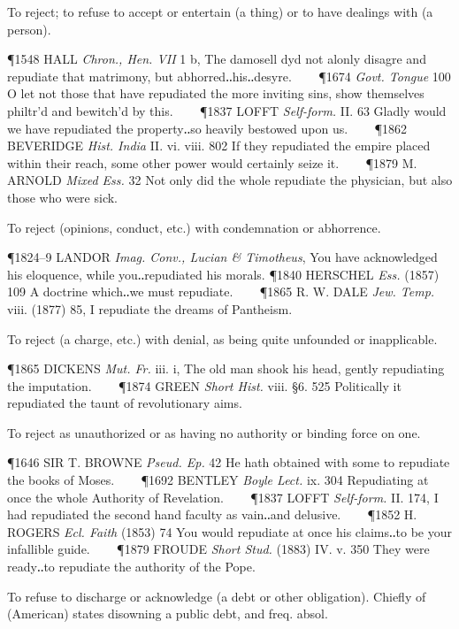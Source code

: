 \begin{description}[wide, labelwidth=!, labelindent=0pt]
\begin{myenumerate}
 To reject; to refuse to accept or entertain (a thing) or to have dealings with (a person).

\P 1548 HALL  \textit{Chron., Hen. VII} 1 b, The damosell dyd not alonly disagre and repudiate that matrimony, but abhorred‥his‥desyre.    
\P 1674  \textit{Govt. Tongue} 100 O let not those that have repudiated the more inviting sins, show themselves philtr'd and bewitch'd by this.    
\P 1837 LOFFT  \textit{Self-form.} II. 63 Gladly would we have repudiated the property‥so heavily bestowed upon us.    
\P 1862 BEVERIDGE  \textit{Hist. India} II. vi. viii. 802 If they repudiated the empire placed within their reach, some other power would certainly seize it.    
\P 1879 M. ARNOLD  \textit{Mixed Ess.} 32 Not only did the whole repudiate the physician, but also those who were sick.

 To reject (opinions, conduct, etc.) with condemnation or abhorrence.

\P 1824–9 LANDOR \textit{Imag. Conv., Lucian \& Timotheus}, You have acknowledged his eloquence, while you‥repudiated his morals. 
\P 1840 HERSCHEL  \textit{Ess.} (1857) 109 A doctrine which‥we must repudiate.    
\P 1865 R. W. DALE  \textit{Jew. Temp.} viii. (1877) 85, I repudiate the dreams of Pantheism.

 To reject (a charge, etc.) with denial, as being quite unfounded or inapplicable.

\P 1865 DICKENS  \textit{Mut. Fr.} iii. i, The old man shook his head, gently repudiating the imputation.    
\P 1874 GREEN  \textit{Short Hist.} viii. §6. 525 Politically it repudiated the taunt of revolutionary aims.

 To reject as unauthorized or as having no authority or binding force on one.

\P 1646 SIR T. BROWNE  \textit{Pseud. Ep.} 42 He hath obtained with some to repudiate the books of Moses.    
\P 1692 BENTLEY  \textit{Boyle Lect.} ix. 304 Repudiating at once the whole Authority of Revelation.    
\P 1837 LOFFT  \textit{Self-form.} II. 174, I had repudiated the second hand faculty as vain‥and delusive.    
\P 1852 H. ROGERS  \textit{Ecl. Faith} (1853) 74 You would repudiate at once his claims‥to be your infallible guide.    
\P 1879 FROUDE  \textit{Short Stud.} (1883) IV. v. 350 They were ready‥to repudiate the authority of the Pope.

 To refuse to discharge or acknowledge (a debt or other obligation). Chiefly of (American) states disowning a public debt, and freq. absol.


\end{myenumerate}
\end{description}
